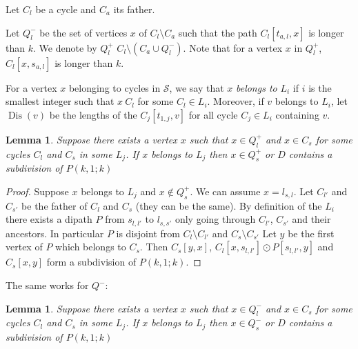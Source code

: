 \documentclass[utf8,10pt]{article}
\theoremstyle{plain}
\newtheorem{lemma}[theorem]{Lemma}
\theoremstyle{definition}
\theoremstyle{remark}
\DeclareMathOperator{\Dis}{Dis}
\begin{document}
Let $C_l$ be a cycle and $C_a$ its father. 

Let $Q^-_l$ be the set of vertices $x$ of $C_l \setminus C_a$ such that the path $C_l[t_{a,l}, x]$ is longer than $k$. 
We denote by $Q^+_l$ $C_l \setminus( C_a \cup Q^-_l) $. Note that for a vertex $x$ in  $Q^+_l$, $C_l[x,s_{a,l}]$ is longer than $k$. 

For a vertex $x$ belonging to cycles in $\mathcal{S}$, we say that $x$ \textit{belongs to}  $L_i$ if
$i$ is the smallest integer such that $x \ C_l$ for some $C_l \in L_i$. Moreover, if $v$ belongs to $L_i$, let $\Dis(v)$ be the lengths of the
$C_j[t_{1,j},v]$ for all cycle $C_j \in  L_i$ containing $v$.

\begin{lemma}\label{lem:Qpos}
Suppose there exists a vertex $x$ such that $x \in Q^+_l$ and $x \in C_s$ for some cycles $C_l$ and $C_s$ in some $L_j$.
If $x$ belongs to $L_j$ then  $x \in  Q^+_s$ or $D$ contains a subdivision of $P(k,1;k)$
\end{lemma}

\begin{proof}
Suppose $x$ belongs to $L_j$ and $x \not \in  Q^+_s$. We can assume $x = l_{s,l}$.
Let $C_{l'}$ and $C_{s'}$ be the father of $C_l$ and $C_s$ (they can be the same). 
By definition of the $L_i$ there exists a dipath $P$ from $s_{l,l'}$ to $l_{s,s'}$ only going through $C_{l'}$, $C_{s'}$ and their ancestors.
In particular $P$ is disjoint from $C_l \setminus C_{l'}$ and  $C_s \setminus C_{s'}$
Let $y$ be the first vertex of $P$ which belongs to $C_s$.
Then $C_s[y,x]$, $C_l[x,s_{l,l'}] \odot P[ s_{l,l'}, y]$ and $C_s[x,y]$ form a subdivision of $P(k,1;k)$. 
\end{proof}

The same works for $Q^-$:

\begin{lemma}\label{lem:Qneg}
Suppose there exists a vertex $x$ such that $x \in Q^-_l$ and $x \in C_s$ for some cycles $C_l$ and $C_s$ in some $L_j$.
If $x$ belongs to $L_j$ then  $x \in  Q^-_s$ or $D$ contains a subdivision of $P(k,1;k)$
\end{lemma}


\end{document}
